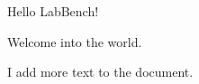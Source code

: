 \documentclass{article}
\begin{document}
Hello LabBench!

Welcome into the world.

I add more text to the document.
\end{document}

